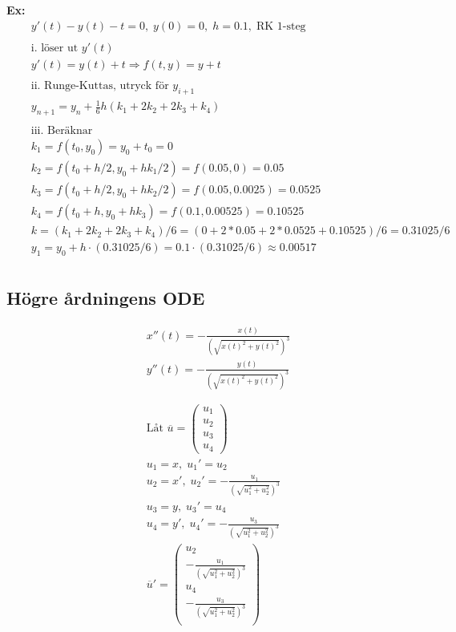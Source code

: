 \documentclass{article}
\begin{document}
\textbf{Ex:}
\begin{align*}
    &\quad  y'(t)-y(t)-t=0, \; y(0)=0, \; h=0.1, \; \text{RK 1-steg} \\
    &\quad  \\
    &\quad  \text{i. löser ut } y'(t) \\
    &\quad  y'(t)=y(t)+t \Rightarrow f(t,y) = y+t \\
    &\quad  \\
    &\quad  \text{ii. Runge-Kuttas, utryck för } y_{i+1} \\
    &\quad  y_{n+1} = y_n+\frac{1}{6}h(k_1+2k_2+2k_3+k_4) \\
    &\quad  \\
    &\quad  \text{iii. Beräknar } \\
    &\quad  k_1 = f(t_0,y_0) = y_0 + t_0 = 0 \\
    &\quad  k_2 = f(t_0+h/2,y_0+hk_1/2) = f(0.05,0) = 0.05 \\
    &\quad  k_3 = f(t_0+h/2,y_0+hk_2/2) = f(0.05,0.0025) = 0.0525 \\
    &\quad  k_4 = f(t_0+h,y_0+hk_3) = f(0.1,0.00525) = 0.10525 \\
    &\quad  k = (k_1+2k_2+2k_3+k_4)/6 = (0+2*0.05+2*0.0525+0.10525)/6=0.31025/6 \\
    &\quad  y_1 = y_0 + h\cdot(0.31025/6) = 0.1\cdot(0.31025/6) \approx 0.00517 \\
\end{align*}

\newpage
\subsection{Högre årdningens ODE}
\begin{align*}
  &\quad  x''(t) = -\frac{x(t)}{(\sqrt{x(t)^2+y(t)^2})^3} \\
  &\quad  y''(t) = -\frac{y(t)}{(\sqrt{x(t)^2+y(t)^2})^3} \\
  &\quad  \\
  &\quad  \\
  &\quad  \text{Låt } \overline{u} =  \begin{pmatrix} u_1 \\ u_2 \\ u_3 \\ u_4 \end{pmatrix} \\
  &\quad  u_1 = x,  \; u_1' = u_2 \\
  &\quad  u_2 = x', \; u_2' = -\frac{u_1}{(\sqrt{u_1^2+u_2^2})^3} \\
  &\quad  u_3 = y,  \; u_3' = u_4 \\
  &\quad  u_4 = y', \; u_4' = -\frac{u_3}{(\sqrt{u_1^2+u_2^2})^3} \\
  &\quad  \overline{u}' =
  \begin{pmatrix}
      u_2 \\
      -\frac{u_1}{(\sqrt{u_1^2+u_2^2})^3} \\
      u_4 \\
      -\frac{u_3}{(\sqrt{u_1^2+u_2^2})^3} \\
  \end{pmatrix} \\
\end{align*}
\end{document}
